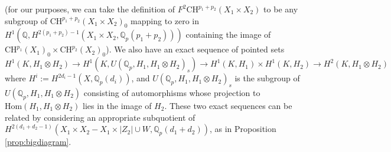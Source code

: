 \documentclass[11pt]{amsart}
\def\Q{\mathbb Q}
\theoremstyle{plain}
\theoremstyle{definition}
\newcommand{\Hom}{\mathrm{Hom}}
\newcommand{\CH}{\mathrm{CH}}
\begin{document}
(for our purposes, we can take the definition of $F^2 \CH ^{p_1 +p_2 }(X_1 \times X_2 )$ to be any subgroup of $\CH ^{p_1 +p_2 }(X_1 \times X_2 )_0 $ mapping to zero in $H^1 (\Q ,H^{2(p_1 +p_2 )-1}(X_1 \times X_2 ,\Q _p (p_1 +p_2 )))$ containing the image of $\CH ^{p_1 }(X_1 )_0 \times \CH ^{p_2 }(X_2 )_0 $).
We also have an exact sequence of pointed sets
\[
H^1 (K,H_1 \otimes H_2 )\to H^1 (K,U(\Q _p ,H_1 ,H_1 \otimes H_2 )_s )\to H^1 (K,H_1 )\times H^1 (K,H_2 )\to H^2 (K, H_1 \otimes H_2 )
\]
where $H^i :=H^{2d_i -1}(X,\Q _p (d_i ))$, and $U(\Q _p ,H_1 ,H_1 \otimes H_2 )_s$ is the subgroup of $U(\Q _p ,H_1 ,H_1 \otimes H_2 )$ consisting of automorphisms whose projection to $\Hom (H_1 ,H_1 \otimes H_2 )$ lies in the image of $H_2 $. These two exact sequences can be related by considering an appropriate subquotient of $H^{2(d_1 +d_2 -1)}(X_1 \times X_2 -X_1 \times |Z_2 | \cup W, \Q _p (d_1 +d_2 ))$, as in Proposition \ref{prop:bigdiagram}.
\end{document}
